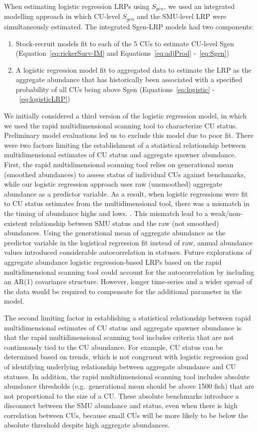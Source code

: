 \documentclass[11pt]{book}
\begin{document}
When estimating logistic regression LRPs using \(S_{gen}\), we used an integrated modelling approach in which CU-level \(S_{gen}\) and the SMU-level LRP were simultaneously estimated. The integrated Sgen-LRP models had two components:
\begin{enumerate}
\def\labelenumi{(\roman{enumi})}
\item
  Stock-recruit models fit to each of the 5 CUs to estimate CU-level Sgen (Equation~\ref{eq:rickerSurv-IM} and Equations~\ref{eq:adjProd} -~\ref{eq:Sgen})
\item
  A logistic regression model fit to aggregated data to estimate the LRP as the aggregate abundance that has historically been associated with a specified probability of all CUs being above Sgen (Equations~\ref{eq:logistic} -~\ref{eq:logisticLRP})
\end{enumerate}
We initially considered a third version of the logistic regression model, in which we used the rapid multidimensional scanning tool to characterize CU status. Preliminary model evaluations led us to exclude this model due to poor fit. There were two factors limiting the establishment of a statistical relationship between multidimensional estimates of CU status and aggregate spawner abundance. First, the rapid multidimensional scanning tool relies on generational mean (smoothed abundances) to assess status of individual CUs against benchmarks, while our logistic regression approach uses raw (unsmoothed) aggregate abundance as a predictor variable. As a result, when logistic regressions were fit to CU status estimates from the multidimensional tool, there was a mismatch in the timing of abundance highs and lows. . This mismatch lead to a weak/non-existent relationship between SMU status and the raw (not smoothed) abundances. Using the generational mean of aggregate abundance as the predictor variable in the logistical regression fit instead of raw, annual abundance values introduced considerable autocorrelation in statuses. Future explorations of aggregate abundance logistic regression-based LRPs based on the rapid multidimensional scanning tool could account for the autocorrelation by including an AR(1) covariance structure. However, longer time-series and a wider spread of the data would be required to compensate for the additional parameter in the model.

The second limiting factor in establishing a statistical relationship between rapid multidimensional estimates of CU status and aggregate spawner abundance is that the rapid multidimensional scanning tool includes criteria that are not continuously tied to the CU abundance. For example, CU status can be determined based on trends, which is not congruent with logistic regression goal of identifying underlying relationship between aggregate abundance and CU statuses. In addition, the rapid multidimensional scanning tool includes absolute abundance thresholds (e.g.~generational mean should be above 1500 fish) that are not proportional to the size of a CU. These absolute benchmarks introduce a disconnect between the SMU abundance and status, even when there is high correlation between CUs, because small CUs will be more likely to be below the absolute threshold despite high aggregate abundances.
\end{document}
